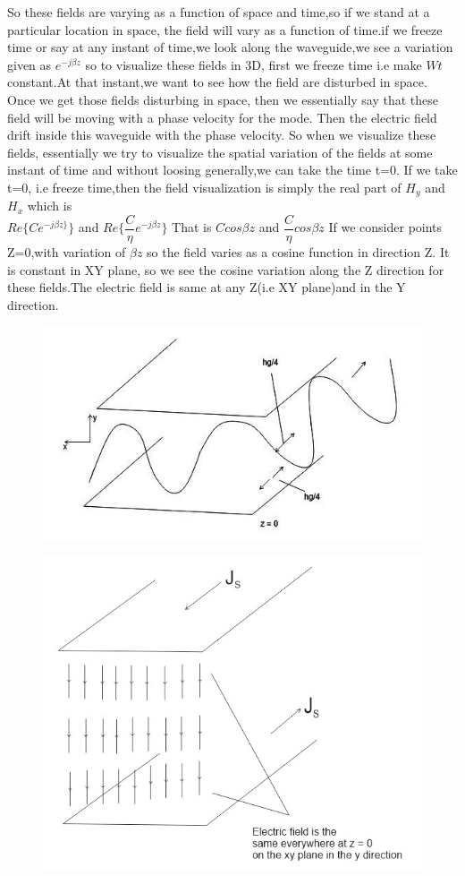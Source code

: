 So these fields are varying as a function of space and time,so if we stand at a particular location in space, the field will vary as a function of time.if we freeze time or say at any instant of time,we look along the waveguide,we see a variation given as ${e^{-j\beta z}}$ so to visualize these fields in 3D, first we freeze time i.e make ${Wt}$ constant.At that instant,we want to see how the field are disturbed in space. Once we get those fields disturbing in space, then we essentially say that these field will be moving with a phase velocity for the mode. Then the electric field drift inside this waveguide with the phase velocity. So when we visualize these fields, essentially we try to visualize the spatial variation of the fields at some instant of time and without loosing generally,we can take the time t=0. If we take t=0, i.e freeze time,then the field visualization is simply the real part of ${H_y}$ and${H_x}$ which is \\
${Re\{Ce^{-j\beta z\}}\}}$ and ${Re\{\dfrac{C}{\eta}e^{-j\beta z}}\}$ That is ${Ccos\beta z}$ and ${\dfrac{C}{\eta}cos\beta z}$ If we consider points Z=0,with variation of ${\beta z}$
so the field varies as a cosine function in direction Z. It is constant in XY plane, so we see the cosine variation along the Z direction for these fields.The electric field is same at any Z(i.e XY plane)and in the Y direction.
\begin{figure}[h]
\centering
\includegraphics[width=.7\linewidth]{./graphics/group4002}
\caption{}
\end{figure}
\begin{figure}[h]
\centering
\includegraphics[width=.7\linewidth]{./graphics/page702}
\caption{}
\end{figure}
